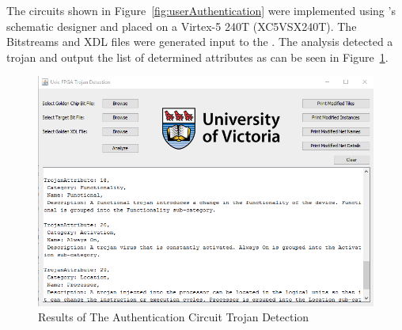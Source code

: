 The circuits shown in Figure~\ref{fig:userAuthentication} were implemented using \Xilinx's schematic designer and placed on a Virtex-5 240T (XC5VSX240T).
The \gls{Bitstream}s and \acrshort{XDL} files were generated input to the \Name.
The analysis detected a trojan and output the list of determined attributes as can be seen in Figure~\ref{fig:backDoorResult}.
\begin{figure}[h]
\centering
\includegraphics[width=1\linewidth]{Figures/backDoorResult}
\caption[Results of The Authentication Circuit Trojan Detection]{Results of The Authentication Circuit Trojan Detection}
\label{fig:backDoorResult}
\end{figure}

